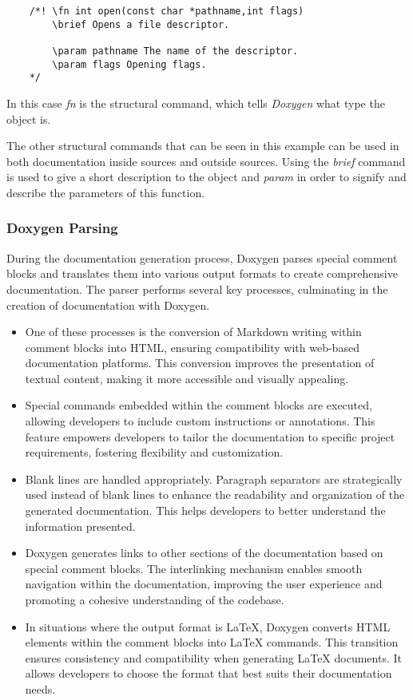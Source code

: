 \begin{verbatim}
    /*! \fn int open(const char *pathname,int flags)
        \brief Opens a file descriptor.

        \param pathname The name of the descriptor.
        \param flags Opening flags.
    */
\end{verbatim}

In this case \textit{fn} is the structural command, which tells \textit{Doxygen} what type the object is.\\
\vspace{\baselineskip}

The other structural commands that can be seen in this example can be used in both documentation inside sources and outside sources. Using the \textit{brief} command 
is used to give a short description to the object and \textit{param} in order to signify and describe the parameters of this function.\\

\subsubsection{Doxygen Parsing}

During the documentation generation process, Doxygen parses special comment blocks and translates them into various output formats to create comprehensive 
documentation. The parser performs several key processes, culminating in the creation of documentation with Doxygen.

\begin{itemize}
    \item[] One of these processes is the conversion of Markdown writing within comment blocks into HTML, ensuring compatibility with web-based documentation platforms. This conversion improves the presentation of textual content, making it more accessible and visually appealing.
    \item[] Special commands embedded within the comment blocks are executed, allowing developers to include custom instructions or annotations. This feature empowers developers to tailor the documentation to specific project requirements, fostering flexibility and customization.
    \item[] Blank lines are handled appropriately. Paragraph separators are strategically used instead of blank lines to enhance the readability and organization of the generated documentation. This helps developers to better understand the information presented.
    \item[] Doxygen generates links to other sections of the documentation based on special comment blocks. The interlinking mechanism enables smooth navigation within the documentation, improving the user experience and promoting a cohesive understanding of the codebase.
    \item[] In situations where the output format is LaTeX, Doxygen converts HTML elements within the comment blocks into LaTeX commands. This transition ensures consistency and compatibility when generating LaTeX documents. It allows developers to choose the format that best suits their documentation needs.
\end{itemize}


